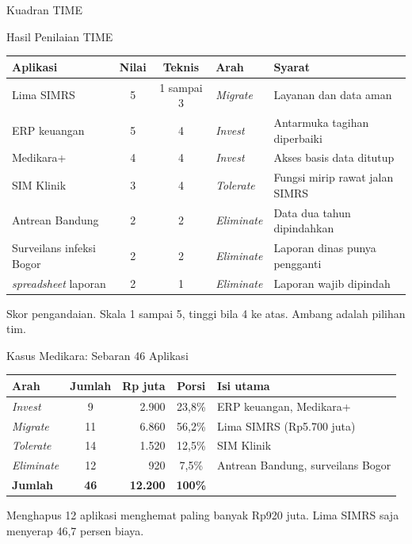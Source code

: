 \documentclass[aspectratio=169, table, 12pt]{beamer}
\begin{document}
\begin{frame}{{\Large Kuadran TIME}}
  \centering
\end{frame}

\begin{frame}{{\Large Hasil Penilaian TIME}}
  \footnotesize
  \begin{tabularx}{\textwidth}{>{\raggedright\arraybackslash}p{4.1cm}cc>{\raggedright\arraybackslash}p{1.9cm}>{\raggedright\arraybackslash}X}
    \hline
    \textbf{Aplikasi} & \textbf{Nilai} & \textbf{Teknis} & \textbf{Arah} & \textbf{Syarat} \\
    \hline
    Lima SIMRS & 5 & 1 sampai 3 & \textit{Migrate} & Layanan dan data aman \\
    \hline
    ERP keuangan & 5 & 4 & \textit{Invest} & Antarmuka tagihan diperbaiki \\
    \hline
    Medikara+ & 4 & 4 & \textit{Invest} & Akses basis data ditutup \\
    \hline
    SIM Klinik & 3 & 4 & \textit{Tolerate} & Fungsi mirip rawat jalan SIMRS \\
    \hline
    Antrean Bandung & 2 & 2 & \textit{Eliminate} & Data dua tahun dipindahkan \\
    \hline
    Surveilans infeksi Bogor & 2 & 2 & \textit{Eliminate} & Laporan dinas punya pengganti \\
    \hline
    23 \textit{spreadsheet} laporan & 2 & 1 & \textit{Eliminate} & Laporan wajib dipindah \\
    \hline
  \end{tabularx}

  \vspace{6pt}
  \small Skor pengandaian. Skala 1 sampai 5, tinggi bila 4 ke atas. Ambang adalah pilihan tim.
\end{frame}

\begin{frame}{{\Large Kasus Medikara: Sebaran 46 Aplikasi}}
  \footnotesize
  \begin{tabularx}{\textwidth}{>{\raggedright\arraybackslash}p{2.2cm}crc>{\raggedright\arraybackslash}X}
    \hline
    \textbf{Arah} & \textbf{Jumlah} & \textbf{Rp juta} & \textbf{Porsi} & \textbf{Isi utama} \\
    \hline
    \textit{Invest} & 9 & 2.900 & 23,8\% & ERP keuangan, Medikara+ \\
    \hline
    \textit{Migrate} & 11 & 6.860 & 56,2\% & Lima SIMRS (Rp5.700 juta) \\
    \hline
    \textit{Tolerate} & 14 & 1.520 & 12,5\% & SIM Klinik \\
    \hline
    \textit{Eliminate} & 12 & 920 & 7,5\% & Antrean Bandung, surveilans Bogor \\
    \hline
    \textbf{Jumlah} & \textbf{46} & \textbf{12.200} & \textbf{100\%} & \\
    \hline
  \end{tabularx}

  \vspace{8pt}
  \small Menghapus 12 aplikasi menghemat paling banyak Rp920 juta. Lima SIMRS saja menyerap 46,7 persen biaya.
\end{frame}
\end{document}
